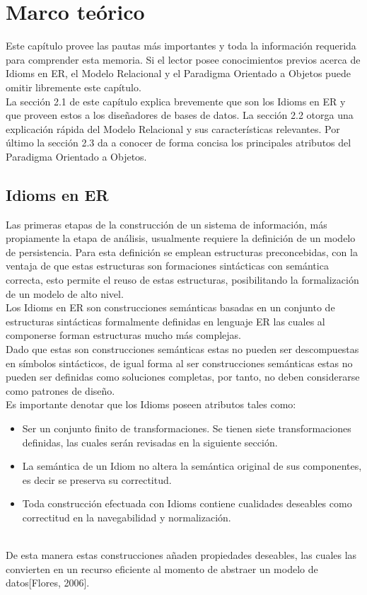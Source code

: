 
\chapter{Marco teórico}
\noindent Este capítulo provee las pautas más importantes y toda la información requerida para
\noindent comprender esta memoria. Si el lector posee conocimientos previos acerca de Idioms en ER,
\noindent el Modelo Relacional y el Paradigma Orientado a Objetos puede omitir libremente este
\noindent capítulo. \\
\indent  La sección 2.1 de este capítulo explica brevemente que son los Idioms en ER y que
\noident proveen estos a los diseñadores de bases de datos. La sección 2.2 otorga una explicación
\noident rápida del Modelo Relacional y sus características relevantes. Por último la sección 2.3
\noident da a conocer de forma concisa los principales atributos del Paradigma Orientado a Objetos.
\section {Idioms en ER}
\noident Las primeras etapas de la construcción de un sistema de información, más propiamente
\noident la etapa de análisis, usualmente requiere la definición de un modelo de persistencia.
\noident Para esta definición se emplean estructuras preconcebidas, con la ventaja de que estas estructuras
\noident son formaciones sintácticas con semántica correcta, esto permite el reuso de estas estructuras, posibilitando
\noident la formalización de un modelo de alto nivel. \\
\indent  Los Idioms en ER son construcciones semánticas basadas en un conjunto de estructuras sintácticas formalmente
\noident definidas en lenguaje ER las cuales al componerse forman estructuras mucho más complejas.\\
\noident Dado que estas son construcciones semánticas estas no pueden ser descompuestas en símbolos sintácticos,
\noident de igual forma al ser construcciones semánticas estas no pueden ser definidas como soluciones completas,
\noident por tanto, no deben considerarse como patrones de diseño.\\
\noident Es importante denotar que los Idioms poseen atributos tales como:
\begin{itemize}
    \item Ser un conjunto finito de transformaciones. Se tienen siete transformaciones definidas, las cuales serán revisadas en la siguiente sección.
    \item La semántica de un Idiom no altera la semántica original de sus componentes, es decir se preserva su correctitud.
    \item Toda construcción efectuada con Idioms contiene cualidades deseables como correctitud en la navegabilidad y normalización.
\end{itemize} \\
\noident De esta manera estas construcciones añaden propiedades deseables, las cuales las convierten en un recurso eficiente al
\noident momento de abstraer un modelo de datos[Flores, 2006].

